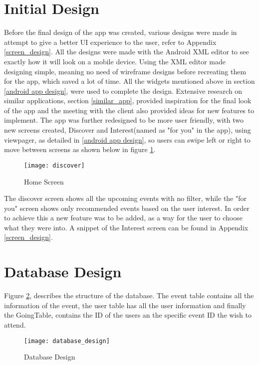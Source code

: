 \section{Initial Design}
Before the final design of the app was created, various designs were made in attempt to give a better UI experience to the user, refer to Appendix \ref{screen_design}. All the designs were made with the Android XML editor to see exactly how it will look on a mobile device. Using the XML editor made designing simple, meaning no need of wireframe designs before recreating them for the app, which saved a lot of time. All the widgets mentioned above in section \ref{android app design}, were used to complete the design.
Extensive research on similar applications, section \ref{similar_app}, provided inspiration for the final look of the app and the meeting with the client also provided ideas for new features to implement. 
The app was further redesigned to be more user friendly, with two new screens created, Discover and Interest(named as "for you" in the app), using viewpager, as detailed in \ref{android app design}, so users can swipe left or right to move between  screens as shown below in figure \ref{fig:homescreen}.

\begin{figure}[h]
	\centering       
	\texttt{[image: discover]}
	\caption{Home Screen}
	\label{fig:homescreen}	
\end{figure}

The discover screen shows all the upcoming events with no filter, while the "for you" screen  shows only recommended events based on the user interest. In order to achieve this a new feature was to be added, as a way for the user to choose what they were into. A snippet of the Interest screen can be found in Appendix \ref{screen_design}.

\section{Database Design}
Figure \ref{fig:database_design}, describes the structure of the database. The event table contains all the information of the event, the user table has all the user information and finally the GoingTable, contains the ID of the users an the specific event ID the wish to attend.
\begin{figure}[h!]
	\centering       
	\texttt{[image: database\_design]}
	\caption{Database Design}
	\label{fig:database_design}	
\end{figure}
